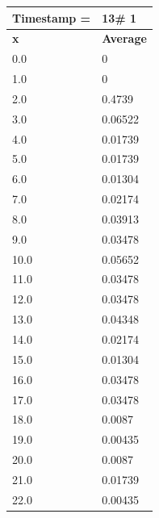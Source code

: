 \begin{tabular}{|l||l|}
\hline
\textbf{Timestamp =} & \textbf{13}\# 1\\\hline
	\textbf{x} & \textbf{Average} \\ \hline
\hline
	0.0 & 0 \\ \hline
	1.0 & 0 \\ \hline
	2.0 & 0.4739 \\ \hline
	3.0 & 0.06522 \\ \hline
	4.0 & 0.01739 \\ \hline
	5.0 & 0.01739 \\ \hline
	6.0 & 0.01304 \\ \hline
	7.0 & 0.02174 \\ \hline
	8.0 & 0.03913 \\ \hline
	9.0 & 0.03478 \\ \hline
	10.0 & 0.05652 \\ \hline
	11.0 & 0.03478 \\ \hline
	12.0 & 0.03478 \\ \hline
	13.0 & 0.04348 \\ \hline
	14.0 & 0.02174 \\ \hline
	15.0 & 0.01304 \\ \hline
	16.0 & 0.03478 \\ \hline
	17.0 & 0.03478 \\ \hline
	18.0 & 0.0087 \\ \hline
	19.0 & 0.00435 \\ \hline
	20.0 & 0.0087 \\ \hline
	21.0 & 0.01739 \\ \hline
	22.0 & 0.00435 \\ \hline
\end{tabular}

